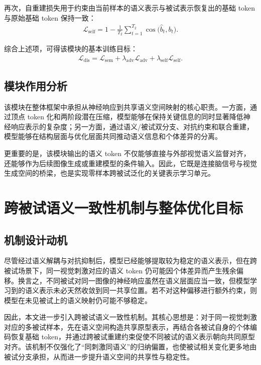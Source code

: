 再次，自重建损失用于约束由当前样本的语义表示与被试表示恢复出的基础 token 与原始基础 token 保持一致：
\begin{align}
  \mathcal{L}_{\mathrm{self}} = 1 - \frac{1}{T_2} \sum_{t=1}^{T_2} \cos\bigl(\hat{b}_t, b_t\bigr).
\end{align}

综合上述项，可得该模块的基本训练目标：
\begin{align}
  \mathcal{L}_{\mathrm{dis}} = \mathcal{L}_{\mathrm{sem}} + \lambda_{\mathrm{adv}} \mathcal{L}_{\mathrm{adv}} + \lambda_{\mathrm{self}} \mathcal{L}_{\mathrm{self}}.
\end{align}

\subsection{模块作用分析}

该模块在整体框架中承担从神经响应到共享语义空间映射的核心职责。一方面，通过顶点 token 化和两阶段潜在压缩，模型能够在保持关键信息的同时显著降低神经响应表示的复杂度；另一方面，通过语义/被试双分支、对抗约束和联合重建，模型能够在结构层面与优化层面共同推动语义信息和个体差异的分离。

更重要的是，该模块输出的语义 token 不仅能够直接与外部视觉语义监督对齐，还能够作为后续图像生成或重建模型的条件输入。因此，它既是连接脑信号与视觉生成空间的桥梁，也是实现零样本跨被试泛化的关键表示学习单元。

\section{跨被试语义一致性机制与整体优化目标}

\subsection{机制设计动机}

尽管经过语义解耦与对抗抑制后，模型已经能够提取较为稳定的语义表示，但在跨被试场景下，同一视觉刺激对应的语义 token 仍可能因个体差异而产生残余偏移。换言之，不同被试对同一图像的神经响应虽然在语义层面应当一致，但模型学习到的语义表示未必天然收敛到同一共享位置。若不对这种偏移进行额外约束，则模型在未见被试上的语义映射仍可能不够稳定。

因此，本文进一步引入跨被试语义一致性机制。其核心思想是：对于同一视觉刺激对应的多被试样本，先在语义空间构造共享原型表示，再结合各被试自身的个体编码恢复基础 token，并通过跨被试重建约束促使不同被试的语义表示朝向共同原型对齐。该机制不仅强化了“同刺激同语义”的归纳偏置，也使被试相关变化更多地由被试分支承担，从而进一步提升语义空间的共享性与稳定性。


